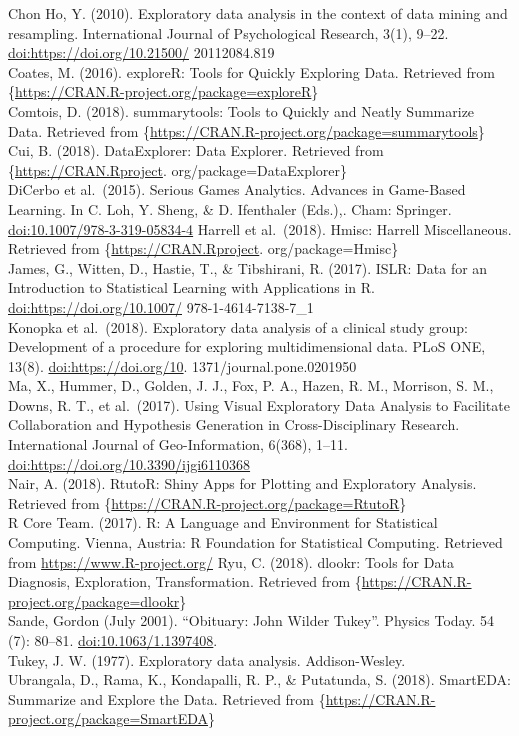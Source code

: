 \documentclass[
]{article}
\begin{document}
Chon Ho, Y. (2010). Exploratory data analysis in the context of data
mining and resampling. International Journal of Psychological Research,
3(1), 9--22. \url{doi:https://doi.org/10.21500/} 20112084.819\\
Coates, M. (2016). exploreR: Tools for Quickly Exploring Data. Retrieved
from \{\url{https://CRAN.R-project.org/package=exploreR}\}\\
Comtois, D. (2018). summarytools: Tools to Quickly and Neatly Summarize
Data. Retrieved from
\{\url{https://CRAN.R-project.org/package=summarytools}\}\\
Cui, B. (2018). DataExplorer: Data Explorer. Retrieved from
\{\url{https://CRAN.Rproject}. org/package=DataExplorer\}\\
DiCerbo et al.~(2015). Serious Games Analytics. Advances in Game-Based
Learning. In C. Loh, Y. Sheng, \& D. Ifenthaler (Eds.),. Cham: Springer.
\url{doi:10.1007/978-3-319-05834-4} Harrell et al.~(2018). Hmisc:
Harrell Miscellaneous. Retrieved from \{\url{https://CRAN.Rproject}.
org/package=Hmisc\}\\
James, G., Witten, D., Hastie, T., \& Tibshirani, R. (2017). ISLR: Data
for an Introduction to Statistical Learning with Applications in R.
\url{doi:https://doi.org/10.1007/} 978-1-4614-7138-7\_1\\
Konopka et al.~(2018). Exploratory data analysis of a clinical study
group: Development of a procedure for exploring multidimensional data.
PLoS ONE, 13(8). \url{doi:https://doi.org/10}.
1371/journal.pone.0201950\\
Ma, X., Hummer, D., Golden, J. J., Fox, P. A., Hazen, R. M., Morrison,
S. M., Downs, R. T., et al.~(2017). Using Visual Exploratory Data
Analysis to Facilitate Collaboration and Hypothesis Generation in
Cross-Disciplinary Research. International Journal of Geo-Information,
6(368), 1--11. \url{doi:https://doi.org/10.3390/ijgi6110368}\\
Nair, A. (2018). RtutoR: Shiny Apps for Plotting and Exploratory
Analysis. Retrieved from
\{\url{https://CRAN.R-project.org/package=RtutoR}\}\\
R Core Team. (2017). R: A Language and Environment for Statistical
Computing. Vienna, Austria: R Foundation for Statistical Computing.
Retrieved from \url{https://www.R-project.org/} Ryu, C. (2018). dlookr:
Tools for Data Diagnosis, Exploration, Transformation. Retrieved from
\{\url{https://CRAN.R-project.org/package=dlookr}\}\\
Sande, Gordon (July 2001). ``Obituary: John Wilder Tukey''. Physics
Today. 54 (7): 80--81. \url{doi:10.1063/1.1397408}.\\
Tukey, J. W. (1977). Exploratory data analysis. Addison-Wesley.\\
Ubrangala, D., Rama, K., Kondapalli, R. P., \& Putatunda, S. (2018).
SmartEDA: Summarize and Explore the Data. Retrieved from
\{\url{https://CRAN.R-project.org/package=SmartEDA}\}
\end{document}
